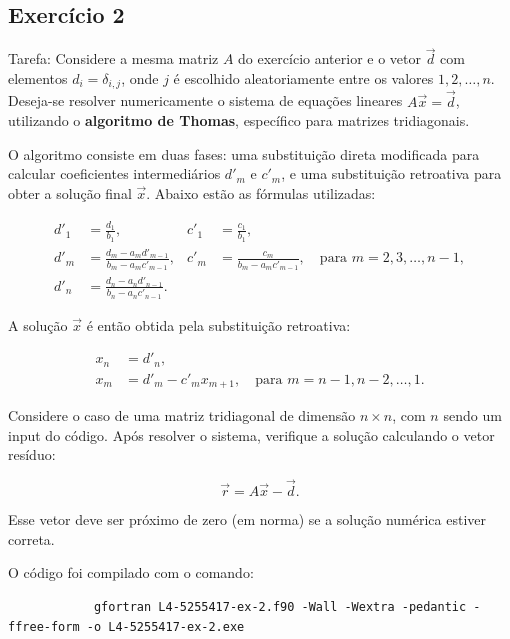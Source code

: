 \documentclass[12pt, a4paper]{article} %
\begin{document}
    \subsection{Exerc\'icio 2}

        Tarefa: Considere a mesma matriz $A$ do exerc\'icio anterior e o vetor $\vec{d}$ com elementos $d_i = \delta_{i,j}$, onde $j$ \'e escolhido aleatoriamente entre os valores $1, 2, \dots, n$. Deseja-se resolver numericamente o sistema de equa\c{c}\~oes lineares $A \vec{x} = \vec{d}$, utilizando o \textbf{algoritmo de Thomas}, espec\'ifico para matrizes tridiagonais.

        O algoritmo consiste em duas fases: uma substitui\c{c}\~ao direta modificada para calcular coeficientes intermedi\'arios $d'_m$ e $c'_m$, e uma substitui\c{c}\~ao retroativa para obter a solu\c{c}\~ao final $\vec{x}$. Abaixo est\~ao as f\'ormulas utilizadas:
        
        \begin{align*}
        d'_1 &= \frac{d_1}{b_1}, &
        c'_1 &= \frac{c_1}{b_1}, \\
        d'_m &= \frac{d_m - a_m d'_{m-1}}{b_m - a_m c'_{m-1}}, &
        c'_m &= \frac{c_m}{b_m - a_m c'_{m-1}}, \quad \text{para } m = 2, 3, \dots, n-1, \\
        d'_n &= \frac{d_n - a_n d'_{n-1}}{b_n - a_n c'_{n-1}}.
        \end{align*}
        
        A solu\c{c}\~ao $\vec{x}$ \'e ent\~ao obtida pela substitui\c{c}\~ao retroativa:
        
        \begin{align*}
        x_n &= d'_n, \\
        x_m &= d'_m - c'_m x_{m+1}, \quad \text{para } m = n-1, n-2, \dots, 1.
        \end{align*}
        
        Considere o caso de uma matriz tridiagonal de dimens\~ao $n \times n$, com $n$ sendo um input do c\'odigo. Ap\'os resolver o sistema, verifique a solu\c{c}\~ao calculando o vetor res\'iduo:
        
        \[
        \vec{r} = A\vec{x} - \vec{d}.
        \]
        
        Esse vetor deve ser pr\'oximo de zero (em norma) se a solu\c{c}\~ao num\'erica estiver correta.        

        O c\'odigo foi compilado com o comando:
        \begin{verbatim}
            gfortran L4-5255417-ex-2.f90 -Wall -Wextra -pedantic -ffree-form -o L4-5255417-ex-2.exe  
        \end{verbatim}
\end{document}

